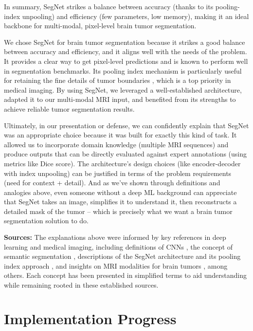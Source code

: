 In summary, SegNet strikes a balance between accuracy (thanks to its pooling-index unpooling) and efficiency (few parameters, low memory), making it an ideal backbone for multi-modal, pixel-level brain tumor segmentation.

We chose SegNet for brain tumor segmentation because it strikes a good balance between accuracy and efficiency, and it aligns well with the needs of the problem. It provides a clear way to get pixel-level predictions and is known to perform well in segmentation benchmarks. Its pooling index mechanism is particularly useful for retaining the fine details of tumor boundaries \cite{fezan2023segmentation}, which is a top priority in medical imaging. By using SegNet, we leveraged a well-established architecture, adapted it to our multi-modal MRI input, and benefited from its strengths to achieve reliable tumor segmentation results.

Ultimately, in our presentation or defense, we can confidently explain that SegNet was an appropriate choice because it was built for exactly this kind of task. It allowed us to incorporate domain knowledge (multiple MRI sequences) and produce outputs that can be directly evaluated against expert annotations (using metrics like Dice score). The architecture's design choices (like encoder-decoder with index unpooling) can be justified in terms of the problem requirements (need for context + detail). And as we've shown through definitions and analogies above, even someone without a deep ML background can appreciate that SegNet takes an image, simplifies it to understand it, then reconstructs a detailed mask of the tumor – which is precisely what we want a brain tumor segmentation solution to do.

\textbf{Sources:} The explanations above were informed by key references in deep learning and medical imaging, including definitions of CNNs \cite{datacamp2023cnn,medium2022cnn}, the concept of semantic segmentation \cite{ieee2023dnn}, descriptions of the SegNet architecture and its pooling index approach \cite{paperswithcode2023segnet,fezan2023segmentation}, and insights on MRI modalities for brain tumors \cite{nature2023mri}, among others. Each concept has been presented in simplified terms to aid understanding while remaining rooted in these established sources.

\section{Implementation Progress}
\label{sec:implementation_progress}

